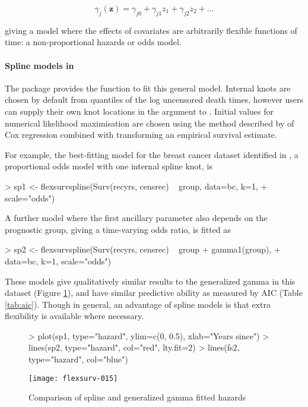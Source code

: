 \documentclass[nojss,nofooter]{jss}
\begin{document}
\[\gamma_j(\mathbf{z}) = \gamma_{j0} + \gamma_{j1}z_1 + \gamma_{j2}z_2 + \ldots\]

giving a model where the effects of covariates are arbitrarily flexible
functions of time: a non-proportional hazards or odds model.

\paragraph{Spline models in }

The package provides the function  to fit this
general model. Internal knots are chosen by default from quantiles of
the log uncensored death times, however users can supply their own
knot locations in the  argument to .
Initial values for numerical likelihood maximisation are chosen using
the method described by \citet{royston:parmar} of Cox regression
combined with transforming an empirical survival estimate.

For example, the best-fitting model for the breast cancer dataset identified in \citet{royston:parmar},
a proportional odds model with one internal spline knot, is
\begin{Schunk}
\begin{Sinput}
> sp1 <- flexsurvspline(Surv(recyrs, censrec) ~ group, data=bc, k=1, 
+                       scale="odds")
\end{Sinput}
\end{Schunk}
A further model where the first ancillary parameter also depends on the prognostic
group, giving a time-varying odds ratio, is fitted as
\begin{Schunk}
\begin{Sinput}
> sp2 <- flexsurvspline(Surv(recyrs, censrec) ~ group + gamma1(group),
+                       data=bc, k=1, scale="odds")
\end{Sinput}
\end{Schunk}
These models give qualitatively similar results to the generalized
gamma in this dataset (Figure \ref{fig:spline:haz}), and have similar
predictive ability as measured by AIC (Table \ref{tab:aic}). Though in
general, an advantage of spline models is that extra flexibility is
available where necessary.
\begin{figure}[h]
  \centering
\begin{Schunk}
\begin{Sinput}
> plot(sp1, type="hazard", ylim=c(0, 0.5), xlab="Years since")
> lines(sp2, type="hazard", col="red", lty.fit=2)
> lines(fs2, type="hazard", col="blue")
\end{Sinput}
\end{Schunk}
\texttt{[image: flexsurv-015]}
  \caption{Comparison of spline and generalized gamma fitted hazards}
  \label{fig:spline:haz}
\end{figure}
\end{document}
